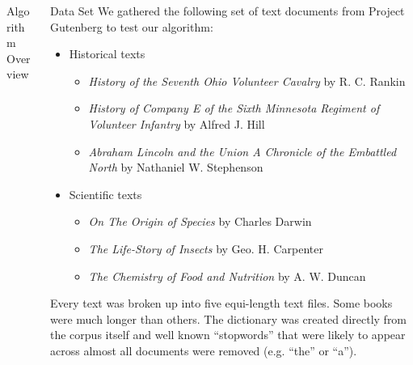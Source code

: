 \documentclass[final]{beamer}
\newlength{\onecolwid}
\newlength{\twocolwid}
\begin{document}
\begin{frame}[t]
\begin{columns}[t]
\begin{column}{\twocolwid}
\begin{columns}[t,totalwidth=\twocolwid]
\begin{column}{\onecolwid}
\begin{block}{Algorithm Overview}
\end{block}


\end{column} %

\begin{column}{\onecolwid}\vspace{-.6in} %




\begin{block}{Data Set}
We gathered the following set of text documents from Project Gutenberg to test our algorithm:


\begin{itemize}
\item Historical texts
	\begin{itemize}
		\item \textit{History of the Seventh Ohio Volunteer Cavalry} by R. C. Rankin
		\item \textit{History of Company E of the Sixth Minnesota Regiment of Volunteer Infantry} by Alfred J. Hill
		\item \textit{Abraham Lincoln and the Union A Chronicle of the Embattled North} by Nathaniel W. Stephenson
	\end{itemize}

\item Scientific texts
	\begin{itemize}
		\item \textit{On The Origin of Species} by Charles Darwin
		\item \textit{The Life-Story of Insects} by Geo. H. Carpenter
		\item \textit{The Chemistry of Food and Nutrition} by A. W. Duncan
	\end{itemize}
\end{itemize}

Every text was broken up into five equi-length text files. Some books were much longer than others. The dictionary was created directly from the corpus itself and well known ``stopwords'' that were likely to appear across almost all documents were removed (e.g. ``the'' or ``a'').


\end{block}
\end{column}
\end{columns}
\end{column}
\end{columns}
\end{frame}
\end{document}
